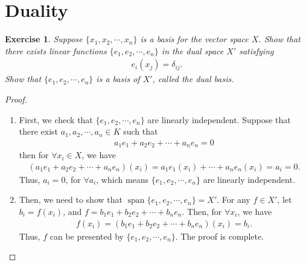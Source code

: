\documentclass[11pt]{book}
\newtheorem{exercise}{Exercise}[section]
\theoremstyle{definition}
\numberwithin{equation}{chapter}
\begin{document}
\section{Duality}
\begin{exercise}
Suppose $\{x_1, x_2,\cdots, x_n\}$ is a basis for the vector space $X$. Show that there exists linear functions $\{e_1, e_2,\cdots, e_n\}$ in the dual space $X'$ satisfying 
\begin{align*}
    e_i(x_j) = \delta_{ij}.
\end{align*}
Show that $\{e_1, e_2,\cdots, e_n\}$ is a basis of $X'$, called the dual basis.
\end{exercise}
\begin{proof}
~\begin{enumerate}[label=(\alph*)]
    \item First, we check that $\{e_1, e_2, \cdots, e_n\}$ are linearly independent. Suppose that there exist  $a_1, a_2, \cdots, a_n \in K$ such that 
    \begin{align*}
        a_1 e_1 + a_2 e_2 + \cdots + a_n e_n = 0
    \end{align*}
    then for $\forall x_i \in X$, we have
    \begin{align*}
        (a_1 e_1 + a_2 e_2 + \cdots + a_n e_n)(x_i) = a_1 e_1(x_i) + \cdots + a_n e_n(x_i) = a_i = 0.
    \end{align*}
    Thus, $a_i = 0$, for $\forall a_i$, which means $\{e_1, e_2, \cdots, e_n\}$ are linearly independent.
    \item Then, we need to show that $\operatorname{span}\{e_1, e_2, \cdots, e_n\} = X'$. For any $f \in X'$, let $b_i  = f(x_i)$, and $f = b_1 e_1 + b_2 e_2 + \cdots + b_n e_n$. Then, for $\forall x_i$, we have
    \begin{align*}
        f(x_i) = (b_1 e_1 + b_2 e_2 + \cdots + b_n e_n)(x_i) = b_i.
    \end{align*}
    Thus, $f$ can be presented by $\{e_1, e_2, \cdots, e_n\}$. The proof is complete.
\end{enumerate}
\end{proof}

\medskip
\end{document}
